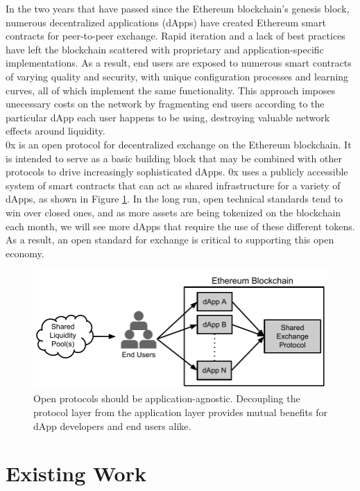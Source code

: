 \documentclass[10pt]{article}
\begin{document}
\noindent In the two years that have passed since the Ethereum blockchain's genesis block, numerous decentralized applications (dApps) have created Ethereum smart contracts for peer-to-peer exchange. Rapid iteration and a lack of best practices have left the blockchain scattered with proprietary and application-specific implementations. As a result, end users are exposed to numerous smart contracts of varying quality and security, with unique configuration processes and learning curves, all of which implement the same functionality. This approach imposes unecessary costs on the network by fragmenting end users according to the particular dApp each user happens to be using, destroying valuable network effects around liquidity. \\

\noindent 0x is an open protocol for decentralized exchange on the Ethereum blockchain. It is intended to serve as a basic building block that may be combined with other protocols to drive increasingly sophisticated dApps\cite{ww1}. 0x uses a publicly accessible system of smart contracts that can act as shared infrastructure for a variety of dApps, as shown in Figure \ref{fig:fig1}. In the long run, open technical standards tend to win over closed ones, and as more assets are being tokenized on the blockchain each month, we will see more dApps that require the use of these different tokens. As a result, an open standard for exchange is critical to supporting this open economy.  \\

\begin{figure}[h]
    \centering
    \includegraphics[width=0.7\linewidth]{../figures/fig1.pdf}
    \caption{Open protocols should be application-agnostic. Decoupling the protocol layer from the application layer provides mutual benefits for dApp developers and end users alike. }
    \label{fig:fig1}
\end{figure}

\clearpage

\pagebreak

\section{Existing Work}
\end{document}
